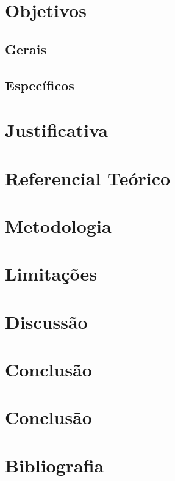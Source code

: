 \documentclass[
  12pt,
]{article}
\begin{document}
\section{Objetivos}\label{objetivos}

\subsection{Gerais}\label{gerais}

\subsection{Específicos}\label{especuxedficos}

\section{Justificativa}\label{justificativa}

\section{Referencial Teórico}\label{referencial-teuxf3rico}

\section{Metodologia}\label{metodologia}

\section{Limitações}\label{limitauxe7uxf5es}

\section{Discussão}\label{discussuxe3o}

\section{Conclusão}\label{conclusuxe3o}

\section{Conclusão}\label{conclusuxe3o-1}

\newpage

\section{Bibliografia}\label{bibliografia}
\end{document}
